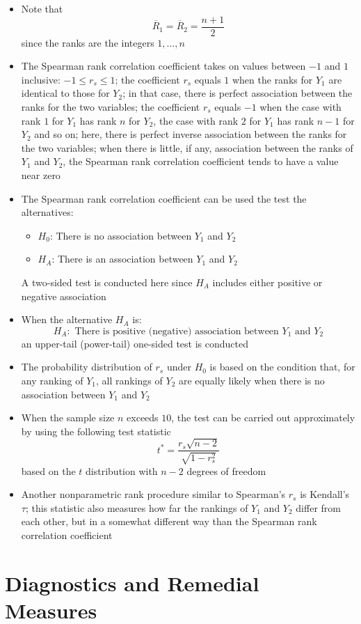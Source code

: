 \begin{itemize}
\item Note that $$ \overline{R}_1 = \overline{R}_2 = \frac{n+1}{2} $$ since the ranks are the integers $1,\dots,n$
\item The Spearman rank correlation coefficient takes on values between $-1$ and $1$ inclusive: $-1 \leq r_s \leq 1$; the coefficient $r_s$ equals $1$ when the ranks for $Y_1$ are identical to those for $Y_2$; in that case, there is perfect association between the ranks for the two variables; the coefficient $r_s$ equals $-1$ when the case with rank $1$ for $Y_1$ has rank $n$ for $Y_2$, the case with rank $2$ for $Y_1$ has rank $n-1$ for $Y_2$ and so on; here, there is perfect inverse association between the ranks for the two variables; when there is little, if any, association between the ranks of $Y_1$ and $Y_2$, the Spearman rank correlation coefficient tends to have a value near zero
\item The Spearman rank correlation coefficient can be used the test the alternatives: \begin{itemize} 
\item $H_0$: There is no association between $Y_1$ and $Y_2$ 
\item $H_A$: There is an association between $Y_1$ and $Y_2$ \end{itemize} 
A two-sided test is conducted here since $H_A$ includes either positive or negative association
\item When the alternative $H_A$ is: $$ H_A: \text{ There is positive (negative) association between $Y_1$ and $Y_2$} $$ 
an upper-tail (power-tail) one-sided test is conducted 
\item The probability distribution of $r_s$ under $H_0$ is based on the condition that, for any ranking of $Y_1$, all rankings of $Y_2$ are equally likely when there is no association between $Y_1$ and $Y_2$
\item When the sample size $n$ exceeds $10$, the test can be carried out approximately by using the following test statistic $$ t^* = \frac{r_s \sqrt{n-2}}{\sqrt{1-r_s^2}} $$ based on the $t$ distribution with $n-2$ degrees of freedom
\item Another nonparametric rank procedure similar to Spearman's $r_s$ is Kendall's $\tau$; this statistic also measures how far the rankings of $Y_1$ and $Y_2$ differ from each other, but in a somewhat different way than the Spearman rank correlation coefficient
\end{itemize}


\section{Diagnostics and Remedial Measures}
